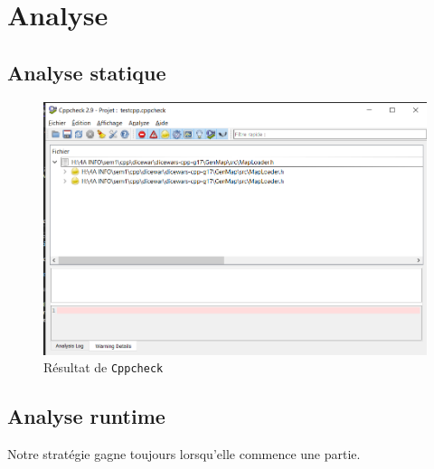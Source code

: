 \documentclass[french,nochapter,11pt]{RapportProjet}
\begin{document}
\clearpage

\section{Analyse}
\subsection{Analyse statique}
\begin{figure}[ht]
    \centering
    \includegraphics[width=14cm]{img/cppcheck.png}
    \caption{Résultat de \texttt{Cppcheck}}
    \label{fig:Cppcheck}
\end{figure}

\subsection{Analyse runtime}
Notre stratégie gagne toujours lorsqu'elle commence une partie.
\end{document}
